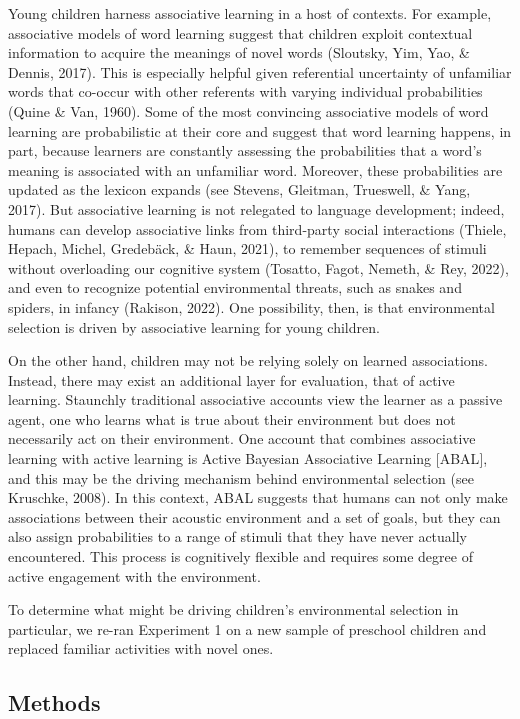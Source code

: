 \documentclass[10pt, letterpaper]{article}
\begin{document}
Young children harness associative learning in a host of contexts. For
example, associative models of word learning suggest that children
exploit contextual information to acquire the meanings of novel words
(Sloutsky, Yim, Yao, \& Dennis, 2017). This is especially helpful given
referential uncertainty of unfamiliar words that co-occur with other
referents with varying individual probabilities (Quine \& Van, 1960).
Some of the most convincing associative models of word learning are
probabilistic at their core and suggest that word learning happens, in
part, because learners are constantly assessing the probabilities that a
word's meaning is associated with an unfamiliar word. Moreover, these
probabilities are updated as the lexicon expands (see Stevens, Gleitman,
Trueswell, \& Yang, 2017). But associative learning is not relegated to
language development; indeed, humans can develop associative links from
third-party social interactions (Thiele, Hepach, Michel, Gredebäck, \&
Haun, 2021), to remember sequences of stimuli without overloading our
cognitive system (Tosatto, Fagot, Nemeth, \& Rey, 2022), and even to
recognize potential environmental threats, such as snakes and spiders,
in infancy (Rakison, 2022). One possibility, then, is that environmental
selection is driven by associative learning for young children.

On the other hand, children may not be relying solely on learned
associations. Instead, there may exist an additional layer for
evaluation, that of active learning. Staunchly traditional associative
accounts view the learner as a passive agent, one who learns what is
true about their environment but does not necessarily act on their
environment. One account that combines associative learning with active
learning is Active Bayesian Associative Learning {[}ABAL{]}, and this
may be the driving mechanism behind environmental selection (see
Kruschke, 2008). In this context, ABAL suggests that humans can not only
make associations between their acoustic environment and a set of goals,
but they can also assign probabilities to a range of stimuli that they
have never actually encountered. This process is cognitively flexible
and requires some degree of active engagement with the environment.

To determine what might be driving children's environmental selection in
particular, we re-ran Experiment 1 on a new sample of preschool children
and replaced familiar activities with novel ones.

\hypertarget{methods-1}{%
\subsection{Methods}\label{methods-1}}
\end{document}
